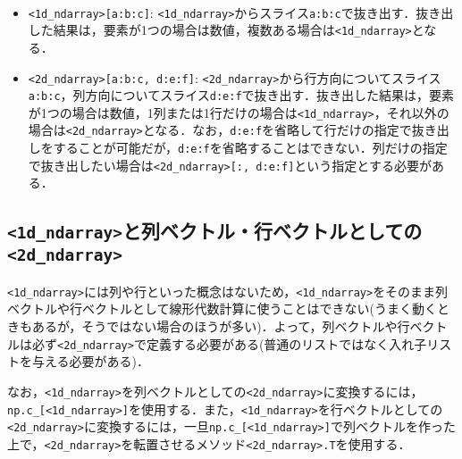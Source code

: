 \begin{gram}　
\begin{itemize}
\item \texttt{<1d\_ndarray>[a:b:c]}: \texttt{<1d\_ndarray>}からスライス\texttt{a:b:c}で抜き出す．抜き出した結果は，要素が1つの場合は数値，複数ある場合は\texttt{<1d\_ndarray>}となる．
\item \texttt{<2d\_ndarray>[a:b:c, d:e:f]}: \texttt{<2d\_ndarray>}から行方向についてスライス\texttt{a:b:c}，列方向についてスライス\texttt{d:e:f}で抜き出す．抜き出した結果は，要素が1つの場合は数値，1列または1行だけの場合は\texttt{<1d\_ndarray>}，それ以外の場合は\texttt{<2d\_ndarray>}となる．なお，\texttt{d:e:f}を省略して行だけの指定で抜き出しをすることが可能だが，\texttt{d:e:f}を省略することはできない．列だけの指定で抜き出したい場合は\texttt{<2d\_ndarray>[:, d:e:f]}という指定とする必要がある．
\end{itemize}
\end{gram}

\begin{cod}[\texttt{num5.py}]　
}]{code/num5.py}
\vspace{-7pt}
\begin{lstlisting}
array_1d[1::2]=
[2 4]
array_2d[::2,::2]=
[[1 3]
 [7 9]]
array_2d[3]=
[10 11 12],shape=(3,)
array_2d[:,1]=
[ 2  5  8 11],shape=(4,)
array_2d[0,0]=
1
\end{lstlisting}
\end{cod}
\vspace{-10pt}

\subsection{\texttt{<1d\_ndarray>}と列ベクトル・行ベクトルとしての\texttt{<2d\_ndarray>}}

\texttt{<1d\_ndarray>}には列や行といった概念はないため，\texttt{<1d\_ndarray>}をそのまま列ベクトルや行ベクトルとして線形代数計算に使うことはできない(うまく動くときもあるが，そうではない場合のほうが多い)．よって，列ベクトルや行ベクトルは必ず\texttt{<2d\_ndarray>}で定義する必要がある(普通のリストではなく入れ子リストを与える必要がある)．

なお，\texttt{<1d\_ndarray>}を列ベクトルとしての\texttt{<2d\_ndarray>}に変換するには，\texttt{np.c\_[<1d\_ndarray>]}を使用する．また，\texttt{<1d\_ndarray>}を行ベクトルとしての\texttt{<2d\_ndarray>}に変換するには，一旦\texttt{np.c\_[<1d\_ndarray>]}で列ベクトルを作った上で，\texttt{<2d\_ndarray>}を転置させるメソッド\texttt{<2d\_ndarray>.T}を使用する．

